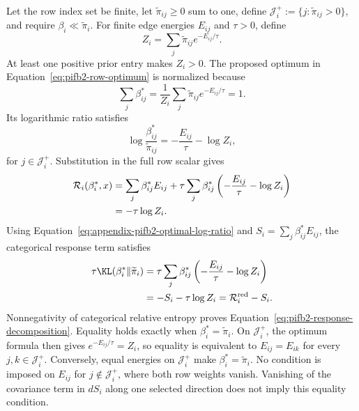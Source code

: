 Let the row index set be finite, let \(\widetilde\pi_{ij}\geq0\) sum to one, define \(\mathcal J_i^+:=\{j:\widetilde\pi_{ij}>0\}\), and require \(\beta_i\ll\widetilde\pi_i\). For finite edge energies \(E_{ij}\) and \(\tau>0\), define
\begin{equation}
Z_i=\sum_j\widetilde\pi_{ij}e^{-E_{ij}/\tau}.
\label{eq:appendix-pifb2-row-partition}
\end{equation}
At least one positive prior entry makes \(Z_i>0\). The proposed optimum in Equation~\eqref{eq:pifb2-row-optimum} is normalized because
\begin{equation}
\sum_j\beta_{ij}^*
=\frac{1}{Z_i}\sum_j\widetilde\pi_{ij}e^{-E_{ij}/\tau}
=1.
\label{eq:appendix-pifb2-beta-normalization}
\end{equation}
Its logarithmic ratio satisfies
\begin{equation}
\log\frac{\beta_{ij}^*}{\widetilde\pi_{ij}}
=-\frac{E_{ij}}{\tau}-\log Z_i,
\label{eq:appendix-pifb2-optimal-log-ratio}
\end{equation}
for \(j\in\mathcal J_i^+\). Substitution in the full row scalar gives
\begin{align}
\mathcal R_i(\beta_i^*,x)
&=\sum_j\beta_{ij}^*E_{ij}
+\tau\sum_j\beta_{ij}^*
\left(-\frac{E_{ij}}{\tau}-\log Z_i\right)
\notag\\
&=-\tau\log Z_i.
\label{eq:appendix-pifb2-row-envelope-substitution}
\end{align}
Using Equation~\eqref{eq:appendix-pifb2-optimal-log-ratio} and \(S_i=\sum_j\beta_{ij}^*E_{ij}\), the categorical response term satisfies
\begin{align}
\tau\KL(\beta_i^*\Vert\widetilde\pi_i)
&=\tau\sum_j\beta_{ij}^*
\left(-\frac{E_{ij}}{\tau}-\log Z_i\right)\notag\\
&=-S_i-\tau\log Z_i
=\mathcal R_i^{\mathrm{red}}-S_i.
\label{eq:appendix-pifb2-response-decomposition}
\end{align}
Nonnegativity of categorical relative entropy proves Equation~\eqref{eq:pifb2-response-decomposition}. Equality holds exactly when \(\beta_i^*=\widetilde\pi_i\). On \(\mathcal J_i^+\), the optimum formula then gives \(e^{-E_{ij}/\tau}=Z_i\), so equality is equivalent to \(E_{ij}=E_{ik}\) for every \(j,k\in\mathcal J_i^+\). Conversely, equal energies on \(\mathcal J_i^+\) make \(\beta_i^*=\widetilde\pi_i\). No condition is imposed on \(E_{ij}\) for \(j\notin\mathcal J_i^+\), where both row weights vanish. Vanishing of the covariance term in \(dS_i\) along one selected direction does not imply this equality condition.

